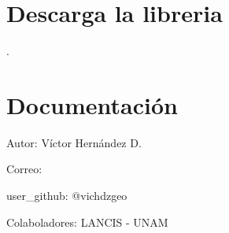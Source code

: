 \documentclass[letterpaper,10pt,spanish]{sphinxmanual}
\begin{document}
\section{Descarga la libreria}
\label{\detokenize{apcsig:descarga-la-libreria}}
.


\section{Documentación}
\label{\detokenize{apcsig:module-apcsig}}\label{\detokenize{apcsig:documentacion}}
Autor: Víctor Hernández D.

Correo: 

user\_github: @vichdzgeo

Colaboladores: LANCIS - UNAM
\end{document}
